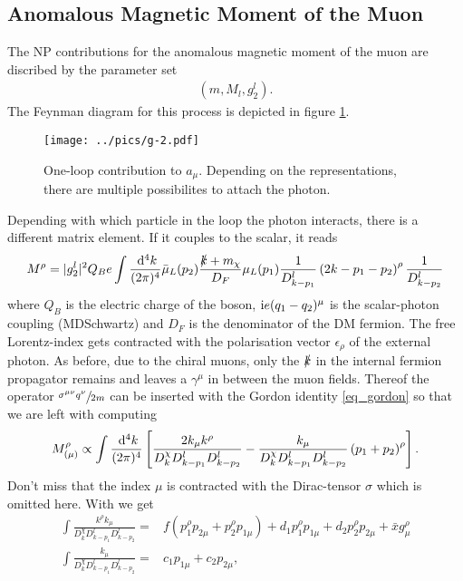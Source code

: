\subsection{Anomalous Magnetic Moment of the Muon}
The NP contributions for the anomalous magnetic moment of the muon are discribed by the parameter set 
\begin{align}
 \left(m, M_l, g_2^l\right).
\end{align}
The Feynman diagram for this process is depicted in figure \ref{pic_g-2}. 
\begin{figure}[t]
 \texttt{[image: ../pics/g-2.pdf]}
 \caption{One-loop contribution to $a_\mu$. Depending on the representations, there are multiple possibilites to attach the photon.}
 \label{pic_g-2}
\end{figure}
Depending with which particle in the loop the photon interacts, there is a different matrix element. If it couples to the scalar, it reads
\begin{align}
 M^\rho = |g_2^l|^2 Q_B e \int \frac{\; \mathrm{d}^4 k}{(2\pi)^4} \bar\mu_L(p_2) \frac{\slashed{k}+m_\chi}{D_F}\mu_L(p_1) \frac{1}{D^l_{k-p_1}}\left(2k-p_1-p_2\right)^\rho\frac{1}{D^l_{k-p_2}}
\end{align}
where $Q_B$ is the electric charge of the boson, $\text{i} e(q_1-q_2)^\mu$ is the scalar-photon coupling (MDSchwartz) and $D_F$ is the denominator of the
DM fermion. The free Lorentz-index gets contracted with
the polarisation vector $\epsilon_\rho$ of the external photon. As before, due to the chiral muons, only the $\slashed{k}$ in the internal fermion
propagator remains and leaves a $\gamma^\mu$ in between the muon fields. Thereof the operator $\sfrac{\sigma^{\mu\nu}q^\nu}{2m}$ can be inserted with the Gordon 
identity \eqref{eq_gordon} so that we are left with computing 
\begin{align}
 M^\rho_{(\mu)} \propto \int\frac{\; \mathrm{d}^4 k}{(2\pi)^4} \left[ \frac{2k_\mu k^\rho}{D^\chi_kD^l_{k-p_1}D^l_{k-p_2}} - \frac{k_\mu}{D^\chi_kD^l_{k-p_1}D^l_{k-p_2}}\left(p_1 +p_2\right)^\rho \right].
\end{align}
Don't miss that the index $\mu$ is contracted with the Dirac-tensor $\sigma$ which is omitted here. With \cite{Lavoura} we get
\begin{align}
 \int\frac{ k^\rho k_\mu}{D^\chi_kD^l_{k-p_1}D^l_{k-p_2}} =&  f (p_1^\rho p_{2\mu} + p_2^\rho p_{1\mu}) +  d_1p_1^\rho p_{1\mu} +  d_2p_2^\rho p_{2\mu} + \bar x g^\rho_\mu\\
 \int\frac{k_\mu}{D^\chi_kD^l_{k-p_1}D^l_{k-p_2}} =&  c_1 p_{1\mu} +  c_2 p_{2\mu},
\end{align}
